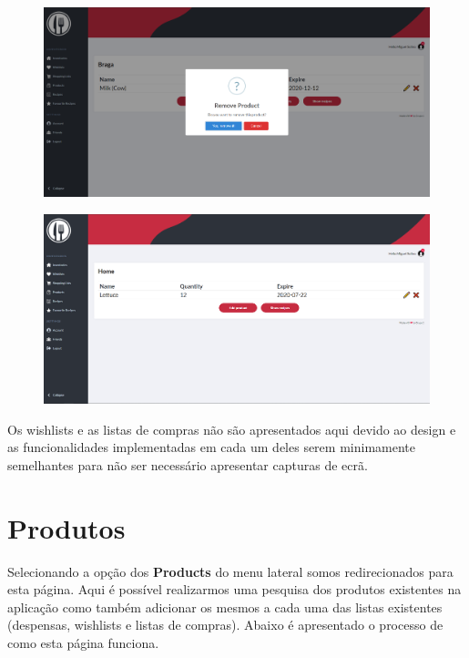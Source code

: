 \documentclass[a4paper]{report}
\begin{document}
    \begin{figure}[H]
        \centering
            \includegraphics[width=\textwidth]{images/produto_final/eliminar_produto.png}
    \end{figure}

    \begin{figure}[H]
        \centering
            \includegraphics[width=\textwidth]{images/produto_final/pagina_iventario_partilhado.png}
    \end{figure}

    Os wishlists e as listas de compras não são apresentados aqui devido ao 
    design e as funcionalidades implementadas em cada um deles serem 
    minimamente semelhantes para não ser necessário apresentar capturas de 
    ecrã.

    \section{Produtos}

    Selecionando a opção dos \textbf{Products} do menu lateral somos
    redirecionados para esta página. Aqui é possível realizarmos uma 
    pesquisa dos produtos existentes na aplicação como também adicionar
    os mesmos a cada uma das listas existentes (despensas, wishlists e 
    listas de compras). Abaixo é apresentado o processo de como esta 
    página funciona.
\end{document}
